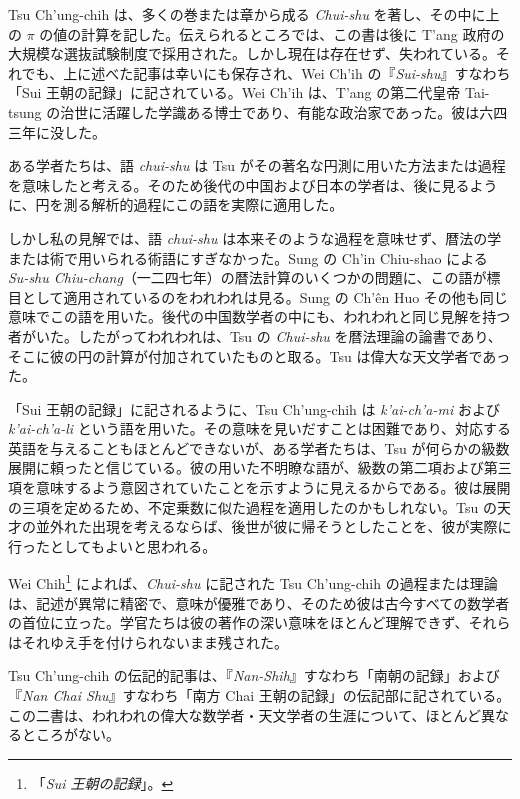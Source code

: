 \documentclass[11pt]{article}
\newcommand{\scanpage}[2]{\clearpage\setcounter{footnote}{0}\noindent{\footnotesize\color{gray}PDF #1 頁 · #2}\par\medskip}
\newcommand{\scanfooter}{}
\begin{document}
Tsu Ch'ung-chih は、多くの巻または章から成る \emph{Chui-shu} を著し、その中に上の $\pi$ の値の計算を記した。伝えられるところでは、この書は後に T'ang 政府の大規模な選抜試験制度で採用された。しかし現在は存在せず、失われている。それでも、上に述べた記事は幸いにも保存され、Wei Ch'ih の『\emph{Sui-shu}』すなわち「Sui 王朝の記録」に記されている。Wei Ch'ih は、T'ang の第二代皇帝 Tai-tsung の治世に活躍した学識ある博士であり、有能な政治家であった。彼は六四三年に没した。

ある学者たちは、語 \emph{chui-shu} は Tsu がその著名な円測に用いた方法または過程を意味したと考える。そのため後代の中国および日本の学者は、後に見るように、円を測る解析的過程にこの語を実際に適用した。
\scanfooter

\scanpage{0065}{第7章、印刷頁51}
\setcounter{footnote}{0}
しかし私の見解では、語 \emph{chui-shu} は本来そのような過程を意味せず、暦法の学または術で用いられる術語にすぎなかった。Sung の Ch'in Chiu-shao による \emph{Su-shu Chiu-chang}（一二四七年）の暦法計算のいくつかの問題に、この語が標目として適用されているのをわれわれは見る。Sung の Ch'ên Huo その他も同じ意味でこの語を用いた。後代の中国数学者の中にも、われわれと同じ見解を持つ者がいた。したがってわれわれは、Tsu の \emph{Chui-shu} を暦法理論の論書であり、そこに彼の円の計算が付加されていたものと取る。Tsu は偉大な天文学者であった。

「Sui 王朝の記録」に記されるように、Tsu Ch'ung-chih は \emph{k'ai-ch'a-mi} および \emph{k'ai-ch'a-li} という語を用いた。その意味を見いだすことは困難であり、対応する英語を与えることもほとんどできないが、ある学者たちは、Tsu が何らかの級数展開に頼ったと信じている。彼の用いた不明瞭な語が、級数の第二項および第三項を意味するよう意図されていたことを示すように見えるからである。彼は展開の三項を定めるため、不定乗数に似た過程を適用したのかもしれない。Tsu の天才の並外れた出現を考えるならば、後世が彼に帰そうとしたことを、彼が実際に行ったとしてもよいと思われる。

Wei Chih\footnote{「\emph{Sui 王朝の記録}」。} によれば、\emph{Chui-shu} に記された Tsu Ch'ung-chih の過程または理論は、記述が異常に精密で、意味が優雅であり、そのため彼は古今すべての数学者の首位に立った。学官たちは彼の著作の深い意味をほとんど理解できず、それらはそれゆえ手を付けられないまま残された。

Tsu Ch'ung-chih の伝記的記事は、『\emph{Nan-Shih}』すなわち「南朝の記録」および『\emph{Nan Chai Shu}』すなわち「南方 Chai 王朝の記録」の伝記部に記されている。この二書は、われわれの偉大な数学者・天文学者の生涯について、ほとんど異なるところがない。
\end{document}
